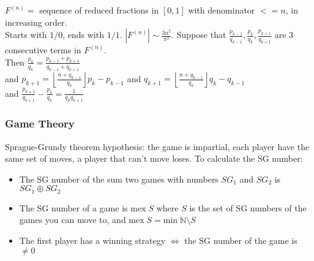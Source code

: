\documentclass[landscape,a4paper,twocolumn,10pt]{report}
\begin{document}
\noindent
$F^{(n)} = $ sequence of reduced fractions in $[0,1]$ with denominator $<= n$, in increasing order. \\
Starts with $1/0$, ends with $1/1$. $|F^{(n)}| \sim \frac{3n^2}{\pi^2}$.
Suppose that $\frac{p_{k-1}}{q_{k-1}}, \frac{p_{k}}{q_{k}}, \frac{p_{k+1}}{q_{k+1}}$ are 3 consecutive terms in $F^{(n)}$. \\
Then $\frac{p_k}{q_k} = \frac{p_{k-1} + p_{k+1}}{q_{k-1} + q_{k+1}}$ \\
and $p_{k+1} = \left\lfloor \frac{n+q_{k-1}}{q_k} \right\rfloor p_k - p_{k-1}$ and  $q_{k+1} = \left\lfloor \frac{n+q_{k-1}}{q_k} \right\rfloor q_k - q_{k-1}$ \\
and $\frac{p_{k+1}}{q_{k+1}} - \frac{p_k}{q_k} = \frac{1}{q_k q_{k+1}}$

\subsubsection*{Game Theory}

Sprague-Grundy theorem hypothesis: the game is impartial, each player have the same set of moves, a player that can't move loses.
To calculate the SG number:
\begin{itemize}
    \item The SG number of the sum two games with numbers $SG_1$ and $SG_2$ is $SG_1 \oplus SG_2$
    \item The SG number of a game is $\mathrm{mex} \; S$ where $S$ is the set of SG numbers of the games you can move to, and $\mathrm{mex} \; S = \mathrm{min} \; \mathbb{N} \setminus S$
    \item The first player has a winning strategy $\Leftrightarrow$ the SG number of the game is $\neq 0$
\end{itemize}
\end{document}
